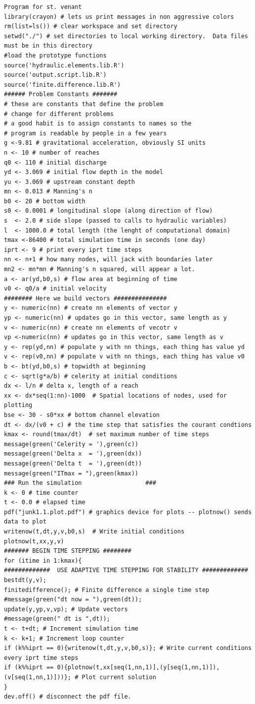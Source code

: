 \begin{lstlisting}[caption=R code for Supervisor Program for Example 1, label=lst:example1mcp]
Program for st. venant
library(crayon) # lets us print messages in non aggressive colors
rm(list=ls()) # clear workspace and set directory
setwd("./") # set directories to local working directory.  Data files must be in this directory
#load the prototype functions
source('hydraulic.elements.lib.R')
source('output.script.lib.R')
source('finite.difference.lib.R')
###### Problem Constants #######
# these are constants that define the problem
# change for different problems
# a good habit is to assign constants to names so the
# program is readable by people in a few years
g <-9.81 # gravitational acceleration, obviously SI units
n <- 10 # number of reaches
q0 <- 110 # initial discharge
yd <- 3.069 # initial flow depth in the model
yu <- 3.069 # upstream constant depth
mn <- 0.013 # Manning's n
b0 <- 20 # bottom width
s0 <- 0.0001 # longitudinal slope (along direction of flow)
s  <- 2.0 # side slope (passed to calls to hydraulic variables)
l  <- 1000.0 # total length (the lenght of computational domain)
tmax <-86400 # total simulation time in seconds (one day)
iprt <- 9 # print every iprt time steps
nn <- n+1 # how many nodes, will jack with boundaries later
mn2 <- mn*mn # Manning's n squared, will appear a lot.
a <- ar(yd,b0,s) # flow area at beginning of time
v0 <- q0/a # initial velocity
######## Here we build vectors ###############
y <- numeric(nn) # create nn elements of vector y
yp <- numeric(nn) # updates go in this vector, same length as y
v <- numeric(nn) # create nn elements of vecotr v
vp <-numeric(nn) # updates go in this vector, same length as v
y <- rep(yd,nn) # populate y with nn things, each thing has value yd
v <- rep(v0,nn) # populate v with nn things, each thing has value v0
b <- bt(yd,b0,s) # topwidth at beginning
c <- sqrt(g*a/b) # celerity at initial conditions
dx <- l/n # delta x, length of a reach
xx <- dx*seq(1:nn)-1000  # Spatial locations of nodes, used for plotting
bse <- 30 - s0*xx # bottom channel elevation
dt <- dx/(v0 + c) # the time step that satisfies the courant condtions
kmax <- round(tmax/dt)  # set maximum number of time steps
message(green('Celerity = '),green(c))
message(green('Delta x  = '),green(dx))
message(green('Delta t  = '),green(dt))
message(green("ITmax = "),green(kmax))
### Run the simulation                  ###
k <- 0 # time counter
t <- 0.0 # elapsed time
pdf("junk1.1.plot.pdf") # graphics device for plots -- plotnow() sends data to plot
writenow(t,dt,y,v,b0,s)  # Write initial conditions
plotnow(t,xx,y,v)
####### BEGIN TIME STEPPING ########
for (itime in 1:kmax){
#############  USE ADAPTIVE TIME STEPPING FOR STABILITY #############
bestdt(y,v);
finitedifference(); # Finite difference a single time step
#message(green("dt now = "),green(dt));
update(y,yp,v,vp); # Update vectors
#message(green(" dt is ",dt));
t <- t+dt; # Increment simulation time
k <- k+1; # Increment loop counter
if (k%%iprt == 0){writenow(t,dt,y,v,b0,s)}; # Write current conditions every iprt time steps
if (k%%iprt == 0){plotnow(t,xx[seq(1,nn,1)],(y[seq(1,nn,1)]),(v[seq(1,nn,1)]))}; # Plot current solution
}
dev.off() # disconnect the pdf file.
\end{lstlisting}

